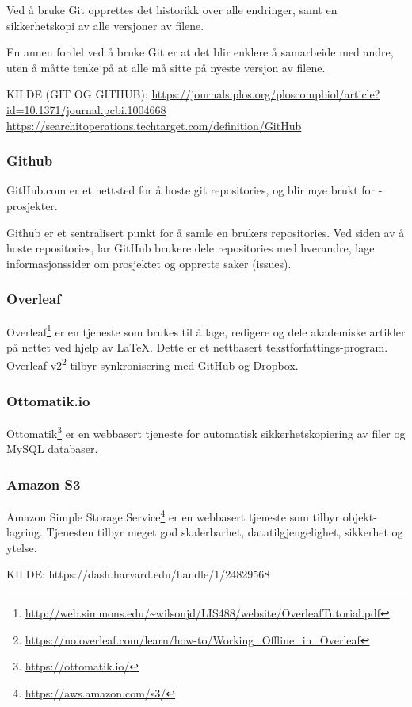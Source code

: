 Ved å bruke Git opprettes det historikk over alle endringer, samt en sikkerhetskopi av alle versjoner av filene.

En annen fordel ved å bruke Git er at det blir enklere å samarbeide med andre, uten å måtte tenke på at alle må sitte på nyeste versjon av filene.

KILDE (GIT OG GITHUB): \url{https://journals.plos.org/ploscompbiol/article?id=10.1371/journal.pcbi.1004668}
\url{https://searchitoperations.techtarget.com/definition/GitHub}

\subsubsection{Github}
GitHub.com er et nettsted for å hoste git repositories, og blir mye brukt for -prosjekter. 

Github er et sentralisert punkt for å samle en brukers repositories. Ved siden av å hoste repositories, lar GitHub brukere dele repositories med hverandre, lage informasjonssider om prosjektet og opprette saker (issues).
 
\subsubsection{Overleaf}
Overleaf\footnote{\url{http://web.simmons.edu/~wilsonjd/LIS488/website/OverleafTutorial.pdf}} er en tjeneste som brukes til å lage, redigere og dele akademiske artikler på nettet ved hjelp av LaTeX. Dette er et nettbasert tekstforfattings-program. 
Overleaf v2\footnote{\url{https://no.overleaf.com/learn/how-to/Working_Offline_in_Overleaf}} tilbyr synkronisering med GitHub og Dropbox.

\subsubsection{Ottomatik.io}
Ottomatik\footnote{\url{https://ottomatik.io/}} er en webbasert tjeneste for automatisk sikkerhetskopiering av filer og MySQL databaser.

\subsubsection{Amazon S3}
Amazon Simple Storage Service\footnote{\url{https://aws.amazon.com/s3/}} er en webbasert tjeneste som tilbyr objekt-lagring. Tjenesten tilbyr meget god skalerbarhet, datatilgjengelighet, sikkerhet og ytelse.

KILDE: https://dash.harvard.edu/handle/1/24829568

